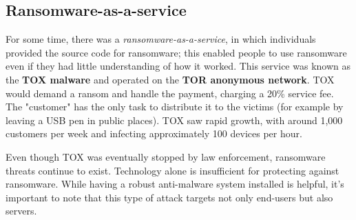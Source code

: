 \subsection{Ransomware-as-a-service}
For some time, there was a \emph{ransomware-as-a-service}, in which individuals provided the source code for ransomware; this enabled people to use ransomware even if they had little understanding of how it worked. This service was known as the \textbf{TOX malware} and operated on the \textbf{TOR anonymous network}. TOX would demand a ransom and handle the payment, charging a 20\% service fee.
The "customer" has the only task to distribute it to the victims (for example by leaving a USB pen in public places).
TOX saw rapid growth, with around 1,000 customers per week and infecting approximately 100 devices per hour.

Even though TOX was eventually stopped by law enforcement, ransomware threats continue to exist. Technology alone is insufficient for protecting against ransomware. While having a robust anti-malware system installed is helpful, it's important to note that this type of attack targets not only end-users but also servers.

